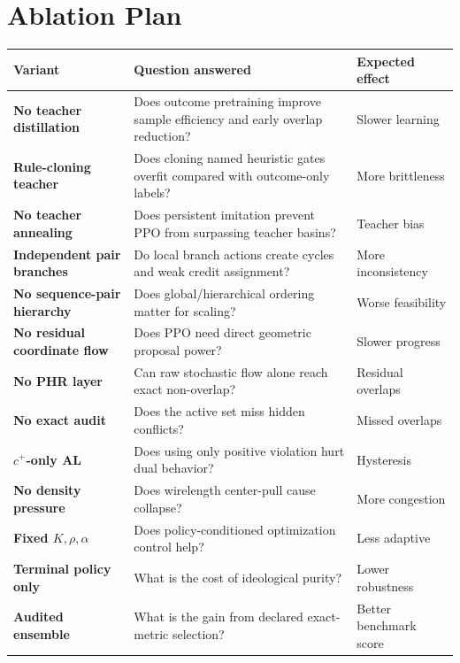 \documentclass[11pt]{article}
\begin{document}
\section{Ablation Plan}

\begin{center}
\small
\begin{tabularx}{\textwidth}{>{\bfseries\color{navy}}p{}Y>{\RaggedLeft\arraybackslash}p{0.18\textwidth}}
\toprule
Variant & Question answered & Expected effect \\
\midrule
No teacher distillation & Does outcome pretraining improve sample efficiency and early overlap reduction? & Slower learning \\
Rule-cloning teacher & Does cloning named heuristic gates overfit compared with outcome-only labels? & More brittleness \\
No teacher annealing & Does persistent imitation prevent PPO from surpassing teacher basins? & Teacher bias \\
Independent pair branches & Do local branch actions create cycles and weak credit assignment? & More inconsistency \\
No sequence-pair hierarchy & Does global/hierarchical ordering matter for scaling? & Worse feasibility \\
No residual coordinate flow & Does PPO need direct geometric proposal power? & Slower progress \\
No PHR layer & Can raw stochastic flow alone reach exact non-overlap? & Residual overlaps \\
No exact audit & Does the active set miss hidden conflicts? & Missed overlaps \\
$c^+$-only AL & Does using only positive violation hurt dual behavior? & Hysteresis \\
No density pressure & Does wirelength center-pull cause collapse? & More congestion \\
Fixed $K,\rho,\alpha$ & Does policy-conditioned optimization control help? & Less adaptive \\
Terminal policy only & What is the cost of ideological purity? & Lower robustness \\
Audited ensemble & What is the gain from declared exact-metric selection? & Better benchmark score \\
\bottomrule
\end{tabularx}
\end{center}

\end{document}

